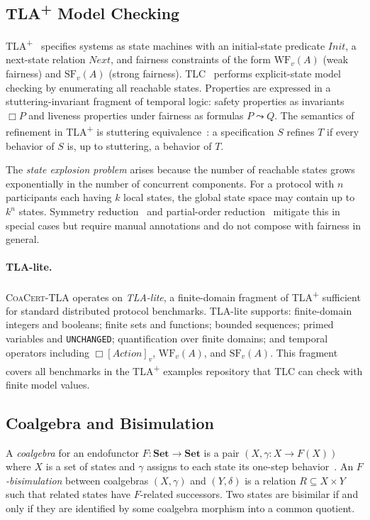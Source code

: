 \documentclass[11pt]{article}
\newcommand{\Set}{\mathbf{Set}}
\newcommand{\WF}{\ensuremath{\mathrm{WF}}}
\newcommand{\SF}{\ensuremath{\mathrm{SF}}}
\newcommand{\CoaCert}{\textsc{CoaCert-TLA}}
\newcommand{\TLAplus}{TLA\textsuperscript{+}}
\begin{document}
\subsection{\TLAplus{} Model Checking}

\TLAplus{}~\cite{Lamport02} specifies systems as state machines with an
initial-state predicate $\mathit{Init}$, a next-state relation
$\mathit{Next}$, and fairness constraints of the form
$\WF_v(A)$ (weak fairness) and $\SF_v(A)$ (strong fairness).
TLC~\cite{TLC} performs explicit-state model checking by enumerating all
reachable states.
Properties are expressed in a stuttering-invariant fragment of temporal logic:
safety properties as invariants $\Box P$ and liveness properties under
fairness as formulas $P \leadsto Q$.
The semantics of refinement in \TLAplus{} is stuttering
equivalence~\cite{Lamport94}: a specification $S$ refines $T$ if every
behavior of $S$ is, up to stuttering, a behavior of $T$.

The \emph{state explosion problem} arises because the number of reachable
states grows exponentially in the number of concurrent components.
For a protocol with $n$ participants each having $k$ local states,
the global state space may contain up to $k^n$ states.
Symmetry reduction~\cite{IpD96} and partial-order reduction~\cite{Peled93}
mitigate this in special cases but require manual annotations and do not
compose with fairness in general.

\paragraph{TLA-lite.}
\CoaCert{} operates on \emph{TLA-lite}, a finite-domain fragment of
\TLAplus{} sufficient for standard distributed protocol benchmarks.
TLA-lite supports: finite-domain integers and booleans; finite sets and
functions; bounded sequences; primed variables and \texttt{UNCHANGED};
quantification over finite domains; and temporal operators including
$\Box[\mathit{Action}]_v$, $\WF_v(A)$, and $\SF_v(A)$.
This fragment covers all benchmarks in the \TLAplus{} examples repository
that TLC can check with finite model values.

\subsection{Coalgebra and Bisimulation}

A \emph{coalgebra} for an endofunctor $F : \Set \to \Set$ is a pair
$(X, \gamma : X \to F(X))$ where $X$ is a set of states and $\gamma$ assigns
to each state its one-step behavior~\cite{Rutten00}.
An \emph{$F$-bisimulation} between coalgebras $(X, \gamma)$ and
$(Y, \delta)$ is a relation $R \subseteq X \times Y$ such that related
states have $F$-related successors.
Two states are bisimilar if and only if they are identified by
some coalgebra morphism into a common quotient.
\end{document}
